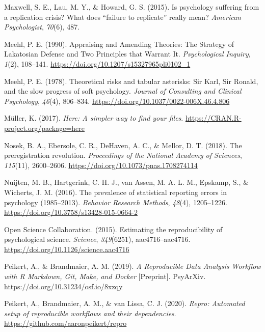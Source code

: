 \documentclass[12pt,a4paper,twoside]{article}
\begin{document}
\leavevmode\hypertarget{ref-maxwellPsychologySufferingReplication2015}{}%
Maxwell, S. E., Lau, M. Y., \& Howard, G. S. (2015). Is psychology suffering from a replication crisis? What does ``failure to replicate'' really mean? \emph{American Psychologist}, \emph{70}(6), 487.

\leavevmode\hypertarget{ref-meehlAppraisingAmendingTheories1990}{}%
Meehl, P. E. (1990). Appraising and Amending Theories: The Strategy of Lakatosian Defense and Two Principles that Warrant It. \emph{Psychological Inquiry}, \emph{1}(2), 108--141. \url{https://doi.org/10.1207/s15327965pli0102_1}

\leavevmode\hypertarget{ref-meehlTheoreticalRisksTabular1978}{}%
Meehl, P. E. (1978). Theoretical risks and tabular asterisks: Sir Karl, Sir Ronald, and the slow progress of soft psychology. \emph{Journal of Consulting and Clinical Psychology}, \emph{46}(4), 806--834. \url{https://doi.org/10.1037/0022-006X.46.4.806}

\leavevmode\hypertarget{ref-R-here}{}%
Müller, K. (2017). \emph{Here: A simpler way to find your files}. \url{https://CRAN.R-project.org/package=here}

\leavevmode\hypertarget{ref-nosekPreregistrationRevolution2018}{}%
Nosek, B. A., Ebersole, C. R., DeHaven, A. C., \& Mellor, D. T. (2018). The preregistration revolution. \emph{Proceedings of the National Academy of Sciences}, \emph{115}(11), 2600--2606. \url{https://doi.org/10.1073/pnas.1708274114}

\leavevmode\hypertarget{ref-nuijtenPrevalenceStatisticalReporting2016}{}%
Nuijten, M. B., Hartgerink, C. H. J., van Assen, M. A. L. M., Epskamp, S., \& Wicherts, J. M. (2016). The prevalence of statistical reporting errors in psychology (1985--2013). \emph{Behavior Research Methods}, \emph{48}(4), 1205--1226. \url{https://doi.org/10.3758/s13428-015-0664-2}

\leavevmode\hypertarget{ref-opensciencecollaborationEstimatingReproducibilityPsychological2015}{}%
Open Science Collaboration. (2015). Estimating the reproducibility of psychological science. \emph{Science}, \emph{349}(6251), aac4716--aac4716. \url{https://doi.org/10.1126/science.aac4716}

\leavevmode\hypertarget{ref-peikertReproducibleDataAnalysis2019}{}%
Peikert, A., \& Brandmaier, A. M. (2019). \emph{A Reproducible Data Analysis Workflow with R Markdown, Git, Make, and Docker} {[}Preprint{]}. PsyArXiv. \url{https://doi.org/10.31234/osf.io/8xzqy}

\leavevmode\hypertarget{ref-R-repro}{}%
Peikert, A., Brandmaier, A. M., \& van Lissa, C. J. (2020). \emph{Repro: Automated setup of reproducible workflows and their dependencies}. \url{https://github.com/aaronpeikert/repro}
\end{document}
